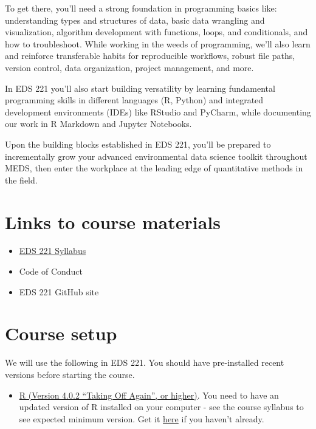 \documentclass[
]{book}
\providecommand{\tightlist}{%
  \setlength{\itemsep}{0pt}\setlength{\parskip}{0pt}}
\begin{document}
To get there, you'll need a strong foundation in programming basics like: understanding types and structures of data, basic data wrangling and visualization, algorithm development with functions, loops, and conditionals, and how to troubleshoot. While working in the weeds of programming, we'll also learn and reinforce transferable habits for reproducible workflows, robust file paths, version control, data organization, project management, and more.

In EDS 221 you'll also start building versatility by learning fundamental programming skills in different languages (R, Python) and integrated development environments (IDEs) like RStudio and PyCharm, while documenting our work in R Markdown and Jupyter Notebooks.

Upon the building blocks established in EDS 221, you'll be prepared to incrementally grow your advanced environmental data science toolkit throughout MEDS, then enter the workplace at the leading edge of quantitative methods in the field.

\hypertarget{links-to-course-materials}{%
\section{Links to course materials}\label{links-to-course-materials}}

\begin{itemize}
\tightlist
\item
  \href{https://docs.google.com/document/d/1OGbc6U3STKdsThUKd9Nj5UgzeB7djgM130ku1UUH1gU/edit?usp=sharing}{EDS 221 Syllabus}
\item
  Code of Conduct
\item
  EDS 221 GitHub site
\end{itemize}

\hypertarget{course-setup}{%
\section{Course setup}\label{course-setup}}

We will use the following in EDS 221. You should have pre-installed recent versions before starting the course.

\begin{itemize}
\tightlist
\item
  \href{https://www.r-project.org/}{R (Version 4.0.2 ``Taking Off Again'', or higher)}. You need to have an updated version of R installed on your computer - see the course syllabus to see expected minimum version. Get it \href{https://www.r-project.org/}{here} if you haven't already.
\end{itemize}
\end{document}
